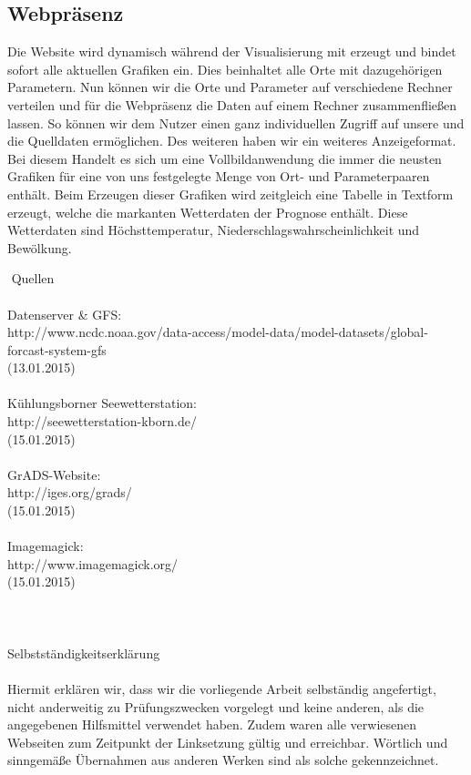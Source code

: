 \documentclass[a4paper,twoside,12pt,titlepage]{article}
\begin{document}
\subsection{Webpräsenz}
Die Website wird dynamisch während der Visualisierung mit erzeugt und bindet sofort alle aktuellen Grafiken ein. Dies beinhaltet alle Orte mit dazugehörigen Parametern. Nun können wir die Orte und Parameter auf verschiedene Rechner verteilen und für die Webpräsenz die Daten auf einem Rechner zusammenfließen lassen. So können wir dem Nutzer einen ganz individuellen Zugriff auf unsere und die Quelldaten ermöglichen. Des weiteren haben wir ein weiteres Anzeigeformat. Bei diesem Handelt es sich um eine Vollbildanwendung die immer die neusten Grafiken für eine von uns festgelegte Menge von Ort- und Parameterpaaren enthält. Beim Erzeugen dieser Grafiken wird zeitgleich eine Tabelle in Textform erzeugt, welche die markanten Wetterdaten der Prognose enthält. Diese Wetterdaten sind Höchsttemperatur, Niederschlagswahrscheinlichkeit und Bewölkung.

\newpage
$ $\\$ $
\Large{Quellen}
\\
\\
\small{
Datenserver \& GFS:\\
http://www.ncdc.noaa.gov/data-access/model-data/model-datasets/global-forcast-system-gfs \\(13.01.2015)\\\\
Kühlungsborner Seewetterstation:\\
http://seewetterstation-kborn.de/ \\(15.01.2015)\\\\
GrADS-Website:\\
http://iges.org/grads/ \\(15.01.2015)\\\\
Imagemagick:\\
http://www.imagemagick.org/ \\(15.01.2015)\\
}
\\
\\
\\
\Large{Selbstständigkeitserklärung}\\
\\
\small Hiermit erklären wir, dass wir die vorliegende Arbeit selbständig angefertigt, nicht anderweitig zu Prüfungszwecken vorgelegt und keine anderen, als die angegebenen Hilfsmittel verwendet haben. Zudem waren alle verwiesenen Webseiten zum Zeitpunkt der Linksetzung gültig und erreichbar. Wörtlich und sinngemäße Übernahmen aus anderen Werken sind als solche gekennzeichnet.
\\ 
\end{document}

